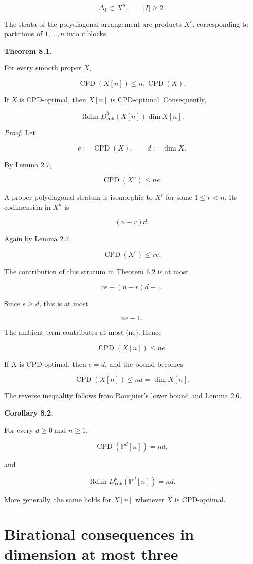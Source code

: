 \documentclass[11pt]{amsart}
\theoremstyle{definition}
\begin{document}
\[
\Delta_I\subset X^n,
\qquad
|I|\ge2.
\]

The strata of the polydiagonal arrangement are products $X^r$, corresponding to partitions of ${1,\dots,n}$ into $r$ blocks.

\noindent\textbf{Theorem 8.1.}

For every smooth proper $X$,

\[
\operatorname{CPD}(X[n])
\le
n,\operatorname{CPD}(X).
\]

If $X$ is CPD-optimal, then $X[n]$ is CPD-optimal. Consequently,

\[
\operatorname{Rdim}D^b_{\mathrm{coh}}(X[n])
\dim X[n].
\]

\noindent\emph{Proof.} Let

\[
e:=\operatorname{CPD}(X),
\qquad
d:=\dim X.
\]

By Lemma 2.7,

\[
\operatorname{CPD}(X^n)\le ne.
\]

A proper polydiagonal stratum is isomorphic to $X^r$ for some $1\le r<n$. Its codimension in $X^n$ is

\[
(n-r)d.
\]

Again by Lemma 2.7,

\[
\operatorname{CPD}(X^r)\le re.
\]

The contribution of this stratum in Theorem 6.2 is at most

\[
re+(n-r)d-1.
\]

Since $e\ge d$, this is at most

\[
ne-1.
\]

The ambient term contributes at most (ne). Hence

\[
\operatorname{CPD}(X[n])\le ne.
\]

If $X$ is CPD-optimal, then $e=d$, and the bound becomes

\[
\operatorname{CPD}(X[n])\le nd=\dim X[n].
\]

The reverse inequality follows from Rouquier's lower bound and Lemma 2.6.

\noindent\textbf{Corollary 8.2.}

For every $d\ge0$ and $n\ge1$,

\[
\operatorname{CPD}(\mathbb P^d[n])=nd,
\]

and

\[
\operatorname{Rdim}D^b_{\mathrm{coh}}(\mathbb P^d[n])=nd.
\]

More generally, the same holds for $X[n]$ whenever $X$ is CPD-optimal.

\section{Birational consequences in dimension at most three}
\end{document}
